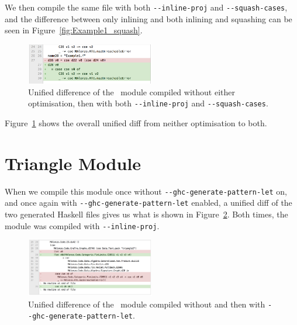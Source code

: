 We then compile the same file with both \texttt{-{}-inline-proj} and \texttt{-{}-squash-cases}, and the difference between only inlining and both inlining and squashing can be seen in Figure~\ref{fig:Example1_squash}.

\begin{figure}[h!]
    \centering
    \includegraphics[width=0.5\textwidth]{Figures/Example1_inline_squash}
    \caption{Unified difference of the ~module compiled without either optimisation, then with both \texttt{-{}-inline-proj} and \texttt{-{}-squash-cases}.}
    \label{fig:Example1_inline_squash}
\end{figure}

Figure~\ref{fig:Example1_inline_squash} shows the overall unified diff from neither optimisation to both.

\newpage

\section{Triangle Module}



When we compile this module once without \texttt{-{}-ghc-generate-pattern-let} on, and once again with \texttt{-{}-ghc-generate-pattern-let} enabled, a unified diff of the two generated Haskell files gives us what is shown in Figure~\ref{fig:Triangle_genplet}. Both times, the module was compiled with \texttt{-{}-inline-proj}.

\begin{figure}[h]
    \centering
    \includegraphics[width=0.5\textwidth]{Figures/Triangle_genplet}
    \caption{Unified difference of the ~module compiled without and then with \texttt{-{}-ghc-generate-pattern-let}.}
    \label{fig:Triangle_genplet}
\end{figure}

